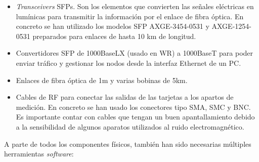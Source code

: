 \begin{itemize}
	\item \textit{Transceivers} SFPs. Son los elementos que convierten las 
	señales eléctricas en lumínicas para transmitir la información por el 
	enlace de fibra óptica. En concreto se han utilizado los modelos SFP 
	AXGE-3454-0531 y AXGE-1254-0531 preparados para enlaces de hasta 10 km de 
	longitud.
	\item Convertidores SFP de 1000BaseLX (usado en WR) a 1000BaseT para poder 
	enviar tráfico y gestionar los nodos desde la interfaz Ethernet de un PC.
	\item Enlaces de fibra óptica de 1m y varias bobinas de 5km.
	\item Cables de RF para conectar las salidas de las tarjetas a los apartos 
	de medición. En concreto se han usado los conectores tipo SMA, SMC y BNC. 
	Es importante contar con cables que tengan un buen apantallamiento debido a 
	la sensibilidad de algunos aparatos utilizados al ruido electromagnético.
\end{itemize}

A parte de todos los componentes físicos, también han sido necesarias múltiples 
herramientas \textit{software}:

